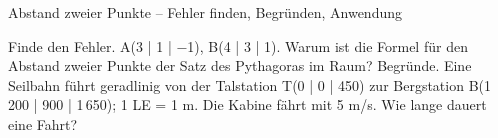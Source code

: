 \begin{aufgabe}{Abstand zweier Punkte – Fehler finden, Begründen, Anwendung}
\begin{teile}
\teil Finde den Fehler. A(3 | 1 | −1), B(4 | 3 | 1). 
\teil Warum ist die Formel für den Abstand zweier Punkte der Satz des Pythagoras im Raum? Begründe.
\teil Eine Seilbahn führt geradlinig von der Talstation T(0 | 0 | 450) zur Bergstation B(1\,200 | 900 | 1\,650); 1 LE = 1 m. Die Kabine fährt mit 5 m/s. Wie lange dauert eine Fahrt? \leerfeld[min]
\end{teile}
\end{aufgabe}
